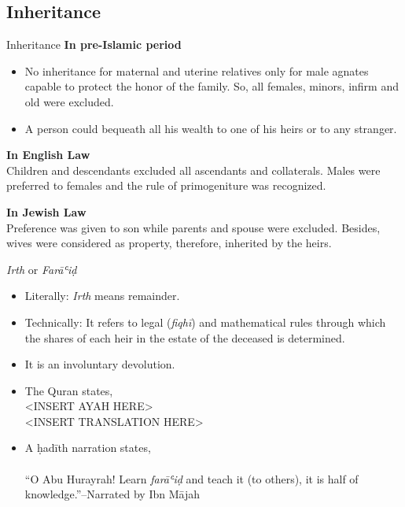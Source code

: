 \begin{frame}{}
\section{Inheritance \hfill {}}
\end{frame}

\begin{frame}{Inheritance \hfill {}}
\textbf{In pre-Islamic period}\\
\begin{itemize}
\item No inheritance for maternal and uterine relatives only for male agnates capable to protect the honor of the family. So, all females, minors, infirm and old were excluded.
\item A person could bequeath all his wealth to one of his heirs or to any stranger.
\end{itemize}
\textbf{In English Law}\\
Children and descendants excluded all ascendants and collaterals. Males were preferred to females and the rule of primogeniture was recognized.

\textbf{In Jewish Law}\\
Preference was given to son while parents and spouse were excluded. Besides, wives were considered as property, therefore, inherited by the heirs.
\end{frame}

\begin{frame}{\textit{Irth} or \textit{Farāʿiḍ} \hfill {}}
\begin{itemize}
\item Literally: \textit{Irth} means remainder.
\item Technically: It refers to legal (\textit{fiqhī}) and mathematical rules through which the shares of each heir in the estate of the deceased is determined.
\item It is an involuntary devolution.
\item The Quran states,\\
<INSERT AYAH HERE>\\
<INSERT TRANSLATION HERE>
\item A ḥadīth narration states,\\
\hfill {}\\
“O Abu Hurayrah! Learn \textit{farāʿiḍ} and teach it (to others), it is half of knowledge.”\hfill--Narrated by Ibn Mājah
\end{itemize}
\end{frame}

